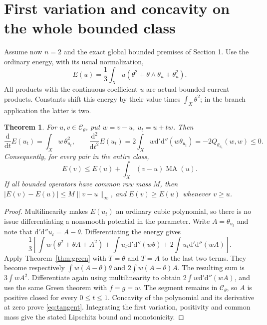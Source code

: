 \documentclass[11pt]{article}
\newtheorem{theorem}{Theorem}
\newcommand{\dd}{\mathrm d'\mathrm d''}
\newcommand{\MA}{\operatorname{MA}}
\begin{document}
\section{First variation and concavity on the whole bounded class}
Assume now $n=2$ and the exact global bounded premises of Section 1.
Use the ordinary energy, with its usual normalization,
\[
 E(u)=\frac13\int_Xu(\theta^2+\theta\wedge\theta_u+\theta_u^2).
\]
All products with the continuous coefficient $u$ are actual bounded
current products. Constants shift this energy by their value times
$\int_X\theta^2$; in the branch application the latter is two.

\begin{theorem}\label{thm:tangent}
For $u,v\in\mathcal C_\theta$, put $w=v-u$, $u_t=u+tw$. Then
\[
 \frac{\mathrm d}{\mathrm dt}E(u_t)=\int_Xw\,\theta_{u_t}^2,
 \qquad
 \frac{\mathrm d^2}{\mathrm dt^2}E(u_t)
     =2\int_Xw\dd(w\theta_{u_t})
     =-2Q_{\theta_{u_t}}(w,w)\leq0.
\]
Consequently, for every pair in the entire class,
\begin{equation}\label{eq:tangent}
             E(v)\leq E(u)+\int_X(v-u)\MA(u).
\end{equation}
If all bounded operators have common raw mass $M$, then
$|E(v)-E(u)|\leq M\|v-u\|_\infty$, and $E(v)\geq E(u)$
whenever $v\geq u$.
\end{theorem}
\begin{proof}
Multilinearity makes $E(u_t)$ an ordinary cubic polynomial, so there
is no issue differentiating a nonsmooth potential in the parameter.
Write $A=\theta_{u_t}$ and note that $\dd u_t=A-\theta$.
Differentiating the energy gives
\[
 \frac13\left[\int w(\theta^2+\theta A+A^2)
       +\int u_t\dd(w\theta)+2\int u_t\dd(wA)\right].
\]
Apply Theorem~\ref{thm:green} with $T=\theta$ and $T=A$ to the
last two terms. They become respectively
$\int w(A-\theta)\theta$ and $2\int w(A-\theta)A$.
The resulting sum is $3\int wA^2$. Differentiate again using
multilinearity to obtain $2\int w\dd(wA)$, and use the same Green
theorem with $f=g=w$. The segment remains in $\mathcal C_\theta$,
so $A$ is positive closed for every $0\leq t\leq1$. Concavity of
the polynomial and its derivative at zero prove \eqref{eq:tangent}.
Integrating the first variation, positivity and common mass give
the stated Lipschitz bound and monotonicity.
\end{proof}
\end{document}
